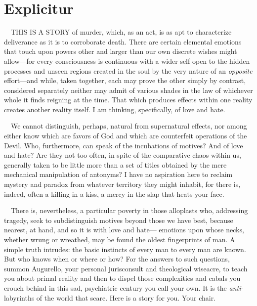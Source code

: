 \chapter*{Explicitur}
%

~~THIS IS A STORY of murder, which, as an act, is as apt to characterize
deliverance as it is to corroborate death. There are certain elemental
emotions that touch upon powers other and larger than our own discrete
wishes might allow---for every consciousness is continuous with a wider
self open to the hidden processes and unseen regions created in the soul
by the very nature of an \emph{opposite} effort---and while, taken
together, each may prove the other simply by contrast, considered
separately neither may admit of various shades in the law of whichever
whole it finds reigning at the time. That which produces effects within
one reality creates another reality itself. I am thinking, specifically,
of love and hate.

~~We cannot distinguish, perhaps, natural from supernatural effects, nor
among either know which are favors of God and which are counterfeit
operations of the Devil. Who, furthermore, can speak of the incubations
of motives? And of love and hate? Are they not too often, in spite of
the comparative chaos within us, generally taken to be little more than
a set of titles obtained by the mere mechanical manipulation of
antonyms? I have no aspiration here to reclaim mystery and paradox from
whatever territory they might inhabit, for there is, indeed, often a
killing in a kiss, a mercy in the slap that heats your face.

~~There is, nevertheless, a particular poverty in those alloplasts who,
addressing tragedy, seek to subdistinguish motives beyond those we have
best, because nearest, at hand, and so it is with love and hate---
emotions upon whose necks, whether wrung or wreathed, may be found the
oldest fingerprints of man. A simple truth intrudes: the basic instincts
of every man to every man are known. But who knows when or where or how?
For the answers to such questions, summon Augurello, your personal
jurisconsult and theological wiseacre, to teach you about primal reality
and then to dispel those complexities and cabals you crouch behind in
this sad, psychiatric century you call your own. It is the
\emph{anti}-labyrinths of the world that scare. Here is a story for you.
Your chair.

\vspace{0.4cm}

